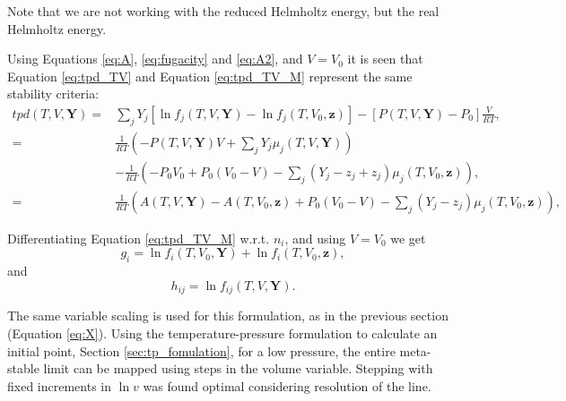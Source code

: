 \documentclass[english]{../thermomemo/thermomemo}
\begin{document}
Note that we are not working with the reduced Helmholtz energy, but
the real Helmholtz energy.

Using Equations \ref{eq:A}, \ref{eq:fugacity} and \ref{eq:A2}, and
$V=V_0$ it is seen that Equation \ref{eq:tpd_TV} and Equation
\ref{eq:tpd_TV_M} represent the same stability criteria:
\begin{align}
  \label{eq:tpd_TV_M2}
  tpd(T,V,\mathbf{Y}) =&
  \underset{j}{\sum}Y_j\left[\ln f_j \left(T,V,\mathbf{Y}\right) -
    \ln f_j\left(T,V_0,\mathbf{z}\right)\right] -
  \left[P\left(T,V,\mathbf{Y}\right) - P_0\right]\frac{V}{RT},\\
  =& \frac{1}{RT}\left(-P\left(T,V,\mathbf{Y}\right) V +
     \underset{j}{\sum}Y_j\mu_j \left(T,V,\mathbf{Y}\right) \right)\\
  & - \frac{1}{RT}\left( - P_0V_0 + P_0\left(V_0-V\right)
    -\underset{j}{\sum}\left(Y_j - z_j + z_j\right)\mu_j\left(T,V_0,\mathbf{z}\right)
  \right)
  ,\\
  =& \frac{1}{RT}\left( A\left(T,V,\mathbf{Y}\right) -
     A\left(T,V_0,\mathbf{z}\right) + P_0\left(V_0-V\right) - \underset{j}{\sum}\left(Y_j - z_j\right)\mu_j\left(T,V_0,\mathbf{z}\right)\right),
\end{align}

Differentiating Equation \ref{eq:tpd_TV_M} w.r.t. $n_i$, and using $V=V_0$ we
get
\begin{equation}
  \label{eq:tpd_TV_n}
  g_i =
 \ln f_i\left(T,V_0,\mathbf{Y}\right) +
 \ln f_i\left(T,V_0,\mathbf{z}\right),
\end{equation}
and
\begin{equation}
  \label{eq:tpd_TV_h}
  h_{ij} =
 \ln f_{ij}\left(T,V,\mathbf{Y}\right) .
\end{equation}

The same variable scaling is used for this formulation, as in the
previous section (Equation \ref{eq:X}). Using the temperature-pressure
formulation to calculate an initial point, Section
\ref{sec:tp_fomulation}, for a low pressure, the entire meta-stable
limit can be mapped using steps in the volume variable. Stepping with
fixed increments in $\ln v$ was found optimal considering resolution of
the line.
\end{document}
